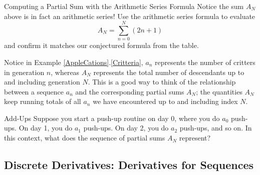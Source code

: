 \begin{exercise}{Computing a Partial Sum with the Arithmetic Series Formula \Coffeecup \Coffeecup}
Notice the sum $A_N$ above is in fact an arithmetic series!  Use the arithmetic series formula to evaluate $$A_N=\sum_{n=0}^N\left(2n+1\right)$$ and confirm it matches our conjectured formula from the table.
\vspace*{.5in}
\end{exercise}
Notice in Example \ref{AppleCations}.\ref{Critteria}, $a_n$ represents the number of critters in generation $n$, whereas $A_N$ represents the total number of descendants up to and including generation $N$.  This is a good way to think of the relationship between a sequence $a_n$ and the corresponding partial sums $A_N$; the quantities $A_N$ keep running totals of all $a_n$ we have encountered up to and including index $N$.
\begin{exercise}{Add-Ups \Coffeecup}
Suppose you start a push-up routine on day 0, where you do $a_0$ push-ups.  On day 1, you do $a_1$ push-ups. On day 2, you do $a_2$ push-ups, and so on.  In this context, what does the sequence of partial sums $A_N$ represent? \vspace*{.2in} 
\end{exercise}
\subsection{Discrete Derivatives: Derivatives for Sequences}

